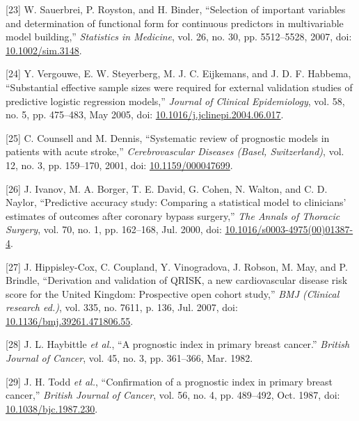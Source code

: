 \documentclass[12pt,PhD,twoside,openright]{muthesis}
\newenvironment{cslreferences}%
  {}%
  {\par}
\begin{document}
\begin{cslreferences}
\leavevmode\hypertarget{ref-sauerbrei_selection_2007}{}%
{[}23{]} W. Sauerbrei, P. Royston, and H. Binder, ``Selection of important variables and determination of functional form for continuous predictors in multivariable model building,'' \emph{Statistics in Medicine}, vol. 26, no. 30, pp. 5512--5528, 2007, doi: \href{https://doi.org/10.1002/sim.3148}{10.1002/sim.3148}.

\leavevmode\hypertarget{ref-vergouwe_substantial_2005}{}%
{[}24{]} Y. Vergouwe, E. W. Steyerberg, M. J. C. Eijkemans, and J. D. F. Habbema, ``Substantial effective sample sizes were required for external validation studies of predictive logistic regression models,'' \emph{Journal of Clinical Epidemiology}, vol. 58, no. 5, pp. 475--483, May 2005, doi: \href{https://doi.org/10.1016/j.jclinepi.2004.06.017}{10.1016/j.jclinepi.2004.06.017}.

\leavevmode\hypertarget{ref-counsell_systematic_2001}{}%
{[}25{]} C. Counsell and M. Dennis, ``Systematic review of prognostic models in patients with acute stroke,'' \emph{Cerebrovascular Diseases (Basel, Switzerland)}, vol. 12, no. 3, pp. 159--170, 2001, doi: \href{https://doi.org/10.1159/000047699}{10.1159/000047699}.

\leavevmode\hypertarget{ref-ivanov_predictive_2000}{}%
{[}26{]} J. Ivanov, M. A. Borger, T. E. David, G. Cohen, N. Walton, and C. D. Naylor, ``Predictive accuracy study: Comparing a statistical model to clinicians' estimates of outcomes after coronary bypass surgery,'' \emph{The Annals of Thoracic Surgery}, vol. 70, no. 1, pp. 162--168, Jul. 2000, doi: \href{https://doi.org/10.1016/s0003-4975(00)01387-4}{10.1016/s0003-4975(00)01387-4}.

\leavevmode\hypertarget{ref-hippisley-cox_derivation_2007}{}%
{[}27{]} J. Hippisley-Cox, C. Coupland, Y. Vinogradova, J. Robson, M. May, and P. Brindle, ``Derivation and validation of QRISK, a new cardiovascular disease risk score for the United Kingdom: Prospective open cohort study,'' \emph{BMJ (Clinical research ed.)}, vol. 335, no. 7611, p. 136, Jul. 2007, doi: \href{https://doi.org/10.1136/bmj.39261.471806.55}{10.1136/bmj.39261.471806.55}.

\leavevmode\hypertarget{ref-haybittle_prognostic_1982}{}%
{[}28{]} J. L. Haybittle \emph{et al.}, ``A prognostic index in primary breast cancer.'' \emph{British Journal of Cancer}, vol. 45, no. 3, pp. 361--366, Mar. 1982.

\leavevmode\hypertarget{ref-todd_confirmation_1987}{}%
{[}29{]} J. H. Todd \emph{et al.}, ``Confirmation of a prognostic index in primary breast cancer,'' \emph{British Journal of Cancer}, vol. 56, no. 4, pp. 489--492, Oct. 1987, doi: \href{https://doi.org/10.1038/bjc.1987.230}{10.1038/bjc.1987.230}.


\end{cslreferences}
\end{document}

